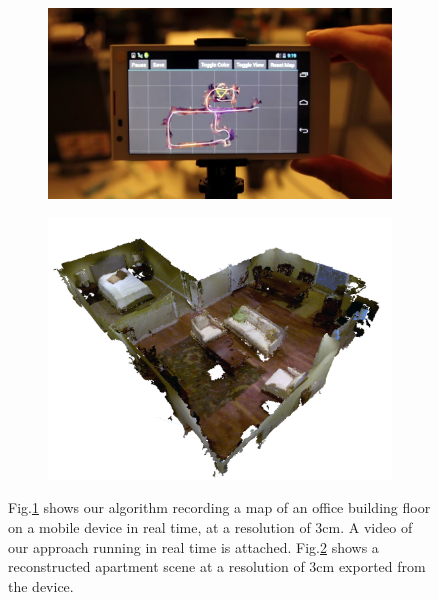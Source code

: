 \documentclass[10pt,twocolumn,letterpaper]{article}
\newcommand{\figref}[1]{Fig.\ref{#1}}
\begin{document}
\maketitle
\begin{figure}
  \centering
    	 \begin{subfigure}{0.39\linewidth} \centering
		 \includegraphics[width=1\textwidth]{img/mapdevice}
		 \caption{}
		 \label{fig:map_device}
	 \end{subfigure}
      	 \begin{subfigure}{0.39\linewidth} \centering
		 \includegraphics[width=1\textwidth]{img/apartment_scene_color.png}
		 \caption{}
		 \label{fig:apartment_color}
	 \end{subfigure}
      \caption{\figref{fig:map_device} shows our algorithm recording a map
      of an office building floor on a mobile device in real time, at a resolution of 3cm. A video of our approach running
  in real time is attached. \figref{fig:apartment_color} shows a
  reconstructed apartment scene at a resolution of 3cm exported from the
  device.}
  \label{fig:first_figure}
\end{figure}
\end{document}
